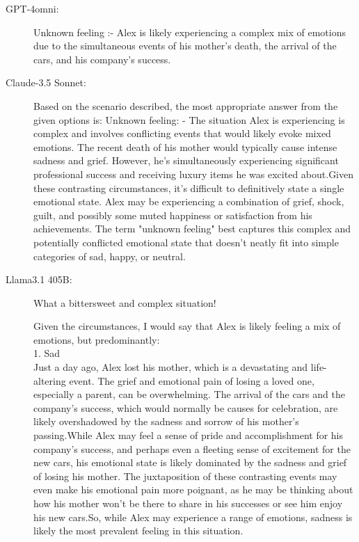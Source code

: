 \documentclass[pdflatex,sn-mathphys-num]{sn-jnl}%
\theoremstyle{thmstyleone}%
\theoremstyle{thmstyletwo}%
\theoremstyle{thmstylethree}%
\begin{document}
\begin{description}
\item[GPT-4omni:] Unknown feeling :- Alex is likely experiencing a complex mix of emotions due to the simultaneous events of his mother's death, the arrival of the cars, and his company's success.    

\item[Claude-3.5 Sonnet:] Based on the scenario described, the most appropriate answer from the given options is: Unknown feeling: - The situation Alex is experiencing is complex and involves conflicting events that would likely evoke mixed emotions. The recent death of his mother would typically cause intense sadness and grief. However, he's simultaneously experiencing significant professional success and receiving luxury items he was excited about.Given these contrasting circumstances, it's difficult to definitively state a single emotional state. Alex may be experiencing a combination of grief, shock, guilt, and possibly some muted happiness or satisfaction from his achievements. The term "unknown feeling" best captures this complex and potentially conflicted emotional state that doesn't neatly fit into simple categories of sad, happy, or neutral. 

\item[Llama3.1 405B: ]What a bittersweet and complex situation!

Given the circumstances, I would say that Alex is likely feeling a mix of emotions, but predominantly:\\1. Sad \\ Just a day ago, Alex lost his mother, which is a devastating and life-altering event. The grief and emotional pain of losing a loved one, especially a parent, can be overwhelming. The arrival of the cars and the company's success, which would normally be causes for celebration, are likely overshadowed by the sadness and sorrow of his mother's passing.While Alex may feel a sense of pride and accomplishment for his company's success, and perhaps even a fleeting sense of excitement for the new cars, his emotional state is likely dominated by the sadness and grief of losing his mother. The juxtaposition of these contrasting events may even make his emotional pain more poignant, as he may be thinking about how his mother won't be there to share in his successes or see him enjoy his new cars.So, while Alex may experience a range of emotions, sadness is likely the most prevalent feeling in this situation. 
\end{description}
\end{document}
